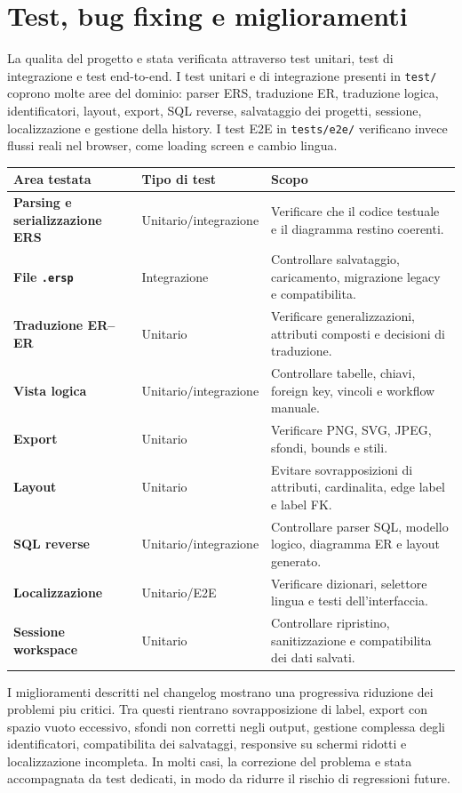 \section{Test, bug fixing e miglioramenti}

La qualita del progetto e stata verificata attraverso test unitari, test di integrazione e test end-to-end. I test unitari e di integrazione presenti in \texttt{test/} coprono molte aree del dominio: parser ERS, traduzione ER, traduzione logica, identificatori, layout, export, SQL reverse, salvataggio dei progetti, sessione, localizzazione e gestione della history. I test E2E in \texttt{tests/e2e/} verificano invece flussi reali nel browser, come loading screen e cambio lingua.

\noindent\begin{tabularx}{\textwidth}{>{\bfseries}p{4cm}p{4cm}X}
Area testata & Tipo di test & Scopo \\
\hline
Parsing e serializzazione ERS & Unitario/integrazione & Verificare che il codice testuale e il diagramma restino coerenti. \\
File \texttt{.ersp} & Integrazione & Controllare salvataggio, caricamento, migrazione legacy e compatibilita. \\
Traduzione ER--ER & Unitario & Verificare generalizzazioni, attributi composti e decisioni di traduzione. \\
Vista logica & Unitario/integrazione & Controllare tabelle, chiavi, foreign key, vincoli e workflow manuale. \\
Export & Unitario & Verificare PNG, SVG, JPEG, sfondi, bounds e stili. \\
Layout & Unitario & Evitare sovrapposizioni di attributi, cardinalita, edge label e label FK. \\
SQL reverse & Unitario/integrazione & Controllare parser SQL, modello logico, diagramma ER e layout generato. \\
Localizzazione & Unitario/E2E & Verificare dizionari, selettore lingua e testi dell'interfaccia. \\
Sessione workspace & Unitario & Controllare ripristino, sanitizzazione e compatibilita dei dati salvati. \\
\end{tabularx}

I miglioramenti descritti nel changelog mostrano una progressiva riduzione dei problemi piu critici. Tra questi rientrano sovrapposizione di label, export con spazio vuoto eccessivo, sfondi non corretti negli output, gestione complessa degli identificatori, compatibilita dei salvataggi, responsive su schermi ridotti e localizzazione incompleta. In molti casi, la correzione del problema e stata accompagnata da test dedicati, in modo da ridurre il rischio di regressioni future.

